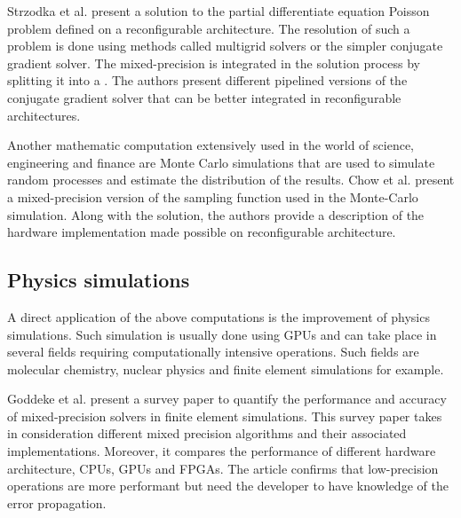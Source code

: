 Strzodka et al. \cite{Strzodka2006} present a solution to the partial differentiate equation Poisson problem defined on a reconfigurable architecture. The resolution of such a problem is done using methods called multigrid solvers or the simpler conjugate gradient solver. The mixed-precision is integrated in the solution process by splitting it into a . The authors present different pipelined versions of the conjugate gradient solver that can be better integrated in reconfigurable architectures.

Another mathematic computation extensively used in the world of science, engineering and finance are Monte Carlo simulations that are used to simulate random processes and estimate the distribution of the results. Chow et al. \cite{Chow2012} present a mixed-precision version of the sampling function used in the Monte-Carlo simulation. Along with the solution, the authors provide a description of the hardware implementation made possible on reconfigurable architecture.


\subsection{Physics simulations}

A direct application of the above computations is the improvement of physics simulations. Such simulation is usually done using GPUs  and can take place in several fields requiring computationally intensive operations. Such fields are molecular chemistry, nuclear physics and finite element simulations for example.


Goddeke et al. \cite{Goddeke2007} present a survey paper to quantify the performance and accuracy of mixed-precision solvers in finite element simulations. This survey paper takes in consideration different mixed precision algorithms and their associated implementations. Moreover, it compares the performance of different hardware architecture, CPUs, GPUs and FPGAs. The article confirms that low-precision operations are more performant but need the developer to have knowledge of the error propagation.

